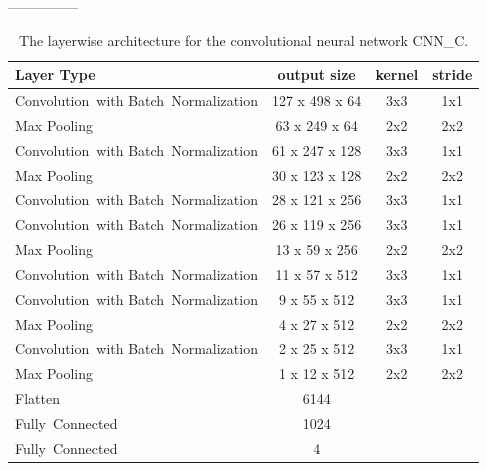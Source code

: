     ---------------
    
  \begin{table}[h]
  \centering
  \begin{tabularx}{\textwidth}{Xccc}
  \toprule
Layer Type                                          & output size    & kernel & stride  \\ \midrule
\mbox{Convolution with} \mbox{Batch Normalization}  & 127 x 498 x 64  & 3x3    & 1x1     \\ 
Max Pooling                                         & 63 x 249 x 64   & 2x2    & 2x2     \\ 
\mbox{Convolution with} \mbox{Batch Normalization}  & 61 x 247 x 128  & 3x3    & 1x1     \\ 
Max Pooling                                         & 30 x 123 x 128  & 2x2    & 2x2     \\ 
\mbox{Convolution with} \mbox{Batch Normalization}  & 28 x 121 x 256  & 3x3    & 1x1     \\ 
\mbox{Convolution with} \mbox{Batch Normalization}  & 26 x 119 x 256  & 3x3    & 1x1     \\ 
Max Pooling                                         & 13 x 59 x 256   & 2x2    & 2x2     \\ 
\mbox{Convolution with} \mbox{Batch Normalization}  & 11 x 57 x 512   & 3x3    & 1x1     \\ 
\mbox{Convolution with} \mbox{Batch Normalization}  & 9 x 55 x 512    & 3x3    & 1x1     \\ 
Max Pooling                                         & 4 x 27 x 512    & 2x2    & 2x2     \\ 
\mbox{Convolution with} \mbox{Batch Normalization}  & 2 x 25 x 512    & 3x3    & 1x1     \\ 
Max Pooling                                         & 1 x 12 x 512    & 2x2    & 2x2     \\ 
Flatten                                             & 6144            &        &         \\                        
\mbox{Fully Connected}                              & 1024            &        &         \\
\mbox{Fully Connected}                              & 4               &        &         \\
  \bottomrule
  \end{tabularx}
  \caption{The layerwise architecture for the convolutional neural network CNN\_C.}
  \label{tab:layers_CNN_C}
  \end{table} 
    
